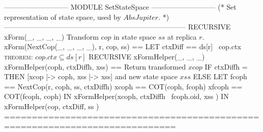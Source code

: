 \documentclass{article}
\begin{document}
\begin{tla}
--------------------------- MODULE SetStateSpace ---------------------------
(*
Set representation of state space, used by $AbsJupiter$.
*)
-----------------------------------------------------------------------------
RECURSIVE xForm(_, _, _, _) \* Transform $cop$ in state space $ss$ at replica $r$.
xForm(NextCop(_, _, _, _), r, cop, ss) == 
    LET ctxDiff == ds[r] \ cop.ctx \* \textsc{theorem}: $cop.ctx \subseteq ds[r]$
        RECURSIVE xFormHelper(_, _, _)
        xFormHelper(coph, ctxDiffh, xss) == \* Return transformed $xcop$
            IF ctxDiffh = {} THEN [xcop |-> coph, xss |-> xss] \* and new state space $xss$
            ELSE LET fcoph == NextCop(r, coph, ss, ctxDiffh)
                     xcoph == COT(coph, fcoph)
                    xfcoph == COT(fcoph, coph)
                 IN  xFormHelper(xcoph, ctxDiffh \ {fcoph.oid}, 
                                        xss )
    IN  xFormHelper(cop, ctxDiff, ss ) 
=============================================================================
\end{tla}
\end{document}
